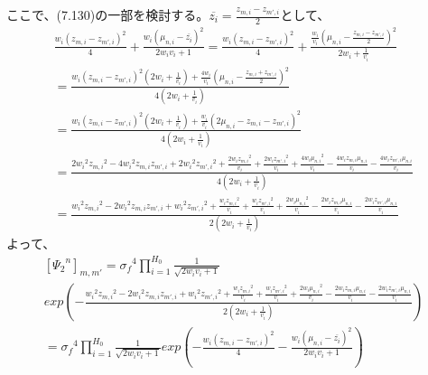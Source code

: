 \documentclass{jsarticle}
\begin{document}
ここで、(7.130)の一部を検討する。$\overline{z_i} = \frac{z_{m, i} - z_{m', i}}{2}$として、
\begin{equation}
\begin{split}
\frac{w_i (z_{m, i} - z_{m', i})^2}{4} + \frac{w_i (\mu_{n, i} - \overline{z_i})^2}{2 w_i v_i + 1} 
= \frac{w_i (z_{m, i} - z_{m', i})^2}{4} + \frac{\frac{w_i}{v_i} (\mu_{n, i} - \frac{z_{m, i} - z_{m', i}}{2})^2}{2 w_i + \frac{1}{v_i}}\\
= \frac{w_i (z_{m, i} - z_{m', i})^2(2 w_i + \frac{1}{v_i}) + \frac{4 w_i}{v_i} (\mu_{n, i} - \frac{z_{m, i} + z_{m', i}}{2})^2}{4(2 w_i + \frac{1}{v_i})}\\
= \frac{w_i (z_{m, i} - z_{m', i})^2(2 w_i + \frac{1}{v_i}) + \frac{w_i}{v_i} (2 \mu_{n, i} - z_{m, i} - z_{m', i})^2}{4(2 w_i + \frac{1}{v_i})}\\
= \frac{2 {w_i}^2 {z_{m, i}}^2 - 4 {w_i}^2 z_{m, i} z_{m', i} + 2 {w_i}^2 {z_{m', i}}^2 + \frac{2 w_i {z_{m, i}}^2}{v_i} + \frac{2 w_i {z_{m', i}}^2}{v_i} + \frac{4 w_i {\mu_{n, i}}^2}{v_i} - \frac{4 w_i z_{m, i} \mu_{n, i}}{v_i} - \frac{4 w_i z_{m', i} \mu_{n, i}}{v_i}}{4(2 w_i + \frac{1}{v_i})}\\
= \frac{{w_i}^2 {z_{m, i}}^2 - 2 {w_i}^2 z_{m, i} z_{m', i} + {w_i}^2 {z_{m', i}}^2 + \frac{w_i {z_{m, i}}^2}{v_i} + \frac{w_i {z_{m', i}}^2}{v_i} + \frac{2 w_i {\mu_{n, i}}^2}{v_i} - \frac{2 w_i z_{m, i} \mu_{n, i}}{v_i} - \frac{2 w_i z_{m', i} \mu_{n, i}}{v_i}}{2(2 w_i + \frac{1}{v_i})}
\end{split}
\end{equation}
よって、
\begin{equation}
\begin{split}
[{\Psi_2}^n]_{m,m'} 
= {\sigma_f}^4 \prod_{i = 1}^{H_0} \frac{1}{\sqrt{2 w_i v_i + 1}}\\
exp(-\frac{{w_i}^2 {z_{m, i}}^2 - 2 {w_i}^2 z_{m, i} z_{m', i} + {w_i}^2 {z_{m', i}}^2 + \frac{w_i {z_{m, i}}^2}{v_i} + \frac{w_i {z_{m', i}}^2}{v_i} + \frac{2 w_i {\mu_{n, i}}^2}{v_i} - \frac{2 w_i z_{m, i} \mu_{n, i}}{v_i} - \frac{2 w_i z_{m', i} \mu_{n, i}}{v_i}}{2(2 w_i + \frac{1}{v_i})})\\
= {\sigma_f}^4 \prod_{i = 1}^{H_0} \frac{1}{\sqrt{2 w_i v_i + 1}}exp(-\frac{w_i (z_{m, i} - z_{m', i})^2}{4} - \frac{w_i (\mu_{n, i} - \overline{z_i})^2}{2 w_i v_i + 1})\\
\end{split}
\end{equation}
\end{document}
